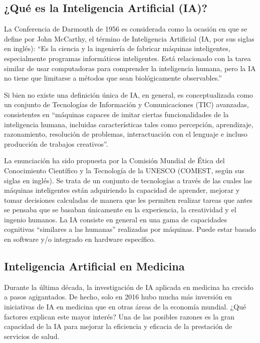 \documentclass[10pt]{article}
\begin{document}
\vspace{0.5cm}
\begin{center}
    \section{¿Qué es la Inteligencia Artificial (IA)?}
\end{center}

La Conferencia de Darmouth de 1956 es considerada como la ocasión en que se define por John McCarthy, el término de Inteligencia Artificial (IA, por sus siglas en inglés): “Es la ciencia y la ingeniería de fabricar máquinas inteligentes, especialmente programas informáticos inteligentes. Está relacionado con la tarea similar de usar computadoras para comprender la inteligencia humana, pero la IA no tiene que limitarse a métodos que sean biológicamente observables.”\cite{mccarthy_what_nodate}


Si bien no existe una definición única de IA, en general, es conceptualizada como un conjunto de Tecnologías de Información y Comunicaciones (TIC) avanzadas, consistentes en “máquinas capaces de imitar ciertas funcionalidades de la inteligencia humana, incluidas características tales como percepción, aprendizaje, razonamiento, resolución de problemas, interactuación con el lenguaje e incluso producción de trabajos creativos”.


La enunciación ha sido propuesta por la Comisión Mundial de Ética del Conocimiento Científico y la Tecnología de la UNESCO (COMEST, según sus siglas en inglés). Se trata de un conjunto de tecnologías a través de las cuales las máquinas inteligentes están adquiriendo la capacidad de aprender, mejorar y tomar decisiones calculadas de manera que les permiten realizar tareas que antes se pensaba que se basaban únicamente en la experiencia, la creatividad y el ingenio humanos. La IA consiste en general en una gama de capacidades cognitivas “similares a las humanas” realizadas por máquinas. Puede estar basado en software y/o integrado en hardware específico. \cite{drnas_de_clement_inteligencia_2022}
\vspace{0.5cm}
\begin{center}
    \section{Inteligencia Artificial en Medicina}
\end{center}


Durante la última década, la investigación de IA aplicada en medicina ha crecido a pasos agigantados. De hecho, solo en 2016 hubo mucha más inversión en iniciativas de IA en medicina que en otras áreas de la economía mundial. ¿Qué factores explican este mayor interés? Una de las posibles razones es la gran capacidad de la IA para mejorar la eficiencia y eficacia de la prestación de servicios de salud.
\end{document}

